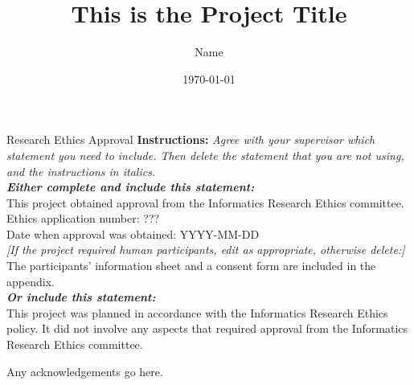 \documentclass[logo,msc]{infthesis}           %
\begin{document}
\begin{preliminary}

\title{This is the Project Title}

\author{Name}

\date{\today}


\maketitle

\newenvironment{ethics}
   {\begin{frontenv}{Research Ethics Approval}{\LARGE}}
   {\end{frontenv}\newpage}

\begin{ethics}
\textbf{Instructions:} \emph{Agree with your supervisor which
statement you need to include. Then delete the statement that you are not using,
and the instructions in italics.\\
\textbf{Either complete and include this statement:}}\\ %
%
This project obtained approval from the Informatics Research Ethics committee.\\
Ethics application number: ???\\
Date when approval was obtained: YYYY-MM-DD\\
%
\emph{[If the project required human participants, edit as appropriate, otherwise delete:]}\\ %
The participants' information sheet and a consent form are included in the appendix.\\
%
\textbf{\emph{Or include this statement:}}\\ %
This project was planned in accordance with the Informatics Research
Ethics policy. It did not involve any aspects that required approval
from the Informatics Research Ethics committee.

\standarddeclaration
\end{ethics}


\begin{acknowledgements}
Any acknowledgements go here.
\end{acknowledgements}


\tableofcontents
\end{preliminary}
\end{document}
